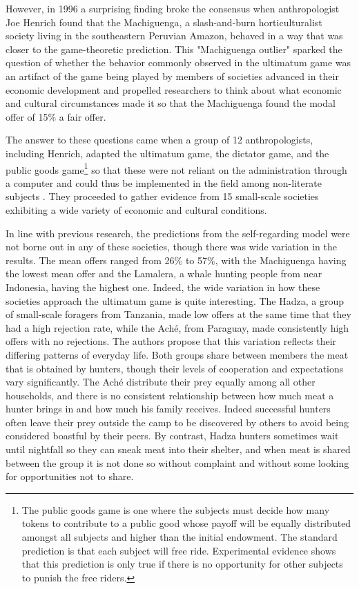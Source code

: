 \documentclass[12pt]{article}
\begin{document}
However, in 1996 a surprising finding broke the consensus when anthropologist Joe Henrich \citep{Henrich2000} found that the Machiguenga, a slash-and-burn horticulturalist society living in the southeastern Peruvian Amazon, behaved in a way that was closer to the game-theoretic prediction. This "Machiguenga outlier" sparked the question of whether the behavior commonly observed in the ultimatum game was an artifact of the game being played by members of societies advanced in their economic development and propelled researchers to think about what economic and cultural circumstances made it so that the Machiguenga found the modal offer of 15\% a fair offer.

The answer to these questions came when a group of 12 anthropologists, including Henrich, adapted the ultimatum game, the dictator game, and the public goods game\footnote{The public goods game is one where the subjects must decide how many tokens to contribute to a public good whose payoff will be equally distributed amongst all subjects and higher than the initial endowment. The standard prediction is that each subject will free ride. Experimental evidence shows that this prediction is only true if there is no opportunity for other subjects to punish the free riders.} so that these were not reliant on the administration through a computer and could thus be implemented in the field among non-literate subjects \citep{henrich2005economic}. They proceeded to gather evidence from 15 small-scale societies exhibiting a wide variety of economic and cultural conditions. 

In line with previous research, the predictions from the self-regarding model were not borne out in any of these societies, though there was wide variation in the results. The mean offers ranged from 26\% to 57\%, with the Machiguenga having the lowest mean offer and the Lamalera, a whale hunting people from near Indonesia, having the highest one. Indeed,  the wide variation in how these societies approach the ultimatum game is quite interesting. The Hadza, a group of small-scale foragers from Tanzania, made low offers at the same time that they had a high rejection rate, while the Aché, from Paraguay, made consistently high offers with no rejections. The authors propose that this variation reflects their differing patterns of everyday life. Both groups share between members the meat that is obtained by hunters, though their levels of cooperation and expectations vary significantly. The Aché distribute their prey equally among all other households, and there is no consistent relationship between how much meat a hunter brings in and how much his family receives. Indeed successful hunters often leave their prey outside the camp to be discovered by others to avoid being considered boastful by their peers. By contrast, Hadza hunters sometimes wait until nightfall so they can sneak meat into their shelter, and when meat is shared between the group it is not done so without complaint and without some looking for opportunities not to share. 
\end{document}
